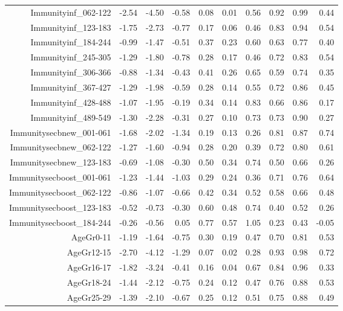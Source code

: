 \begin{table}[ht]
\begin{tabular}{rrrrrrrrrr}
  Immunityinf\_062-122 & -2.54 & -4.50 & -0.58 & 0.08 & 0.01 & 0.56 & 0.92 & 0.99 & 0.44 \\ 
  Immunityinf\_123-183 & -1.75 & -2.73 & -0.77 & 0.17 & 0.06 & 0.46 & 0.83 & 0.94 & 0.54 \\ 
  Immunityinf\_184-244 & -0.99 & -1.47 & -0.51 & 0.37 & 0.23 & 0.60 & 0.63 & 0.77 & 0.40 \\ 
  Immunityinf\_245-305 & -1.29 & -1.80 & -0.78 & 0.28 & 0.17 & 0.46 & 0.72 & 0.83 & 0.54 \\ 
  Immunityinf\_306-366 & -0.88 & -1.34 & -0.43 & 0.41 & 0.26 & 0.65 & 0.59 & 0.74 & 0.35 \\ 
  Immunityinf\_367-427 & -1.29 & -1.98 & -0.59 & 0.28 & 0.14 & 0.55 & 0.72 & 0.86 & 0.45 \\ 
  Immunityinf\_428-488 & -1.07 & -1.95 & -0.19 & 0.34 & 0.14 & 0.83 & 0.66 & 0.86 & 0.17 \\ 
  Immunityinf\_489-549 & -1.30 & -2.28 & -0.31 & 0.27 & 0.10 & 0.73 & 0.73 & 0.90 & 0.27 \\ 
  Immunitysecbnew\_001-061 & -1.68 & -2.02 & -1.34 & 0.19 & 0.13 & 0.26 & 0.81 & 0.87 & 0.74 \\ 
  Immunitysecbnew\_062-122 & -1.27 & -1.60 & -0.94 & 0.28 & 0.20 & 0.39 & 0.72 & 0.80 & 0.61 \\ 
  Immunitysecbnew\_123-183 & -0.69 & -1.08 & -0.30 & 0.50 & 0.34 & 0.74 & 0.50 & 0.66 & 0.26 \\ 
  Immunitysecboost\_001-061 & -1.23 & -1.44 & -1.03 & 0.29 & 0.24 & 0.36 & 0.71 & 0.76 & 0.64 \\ 
  Immunitysecboost\_062-122 & -0.86 & -1.07 & -0.66 & 0.42 & 0.34 & 0.52 & 0.58 & 0.66 & 0.48 \\ 
  Immunitysecboost\_123-183 & -0.52 & -0.73 & -0.30 & 0.60 & 0.48 & 0.74 & 0.40 & 0.52 & 0.26 \\ 
  Immunitysecboost\_184-244 & -0.26 & -0.56 & 0.05 & 0.77 & 0.57 & 1.05 & 0.23 & 0.43 & -0.05 \\ 
  AgeGr0-11 & -1.19 & -1.64 & -0.75 & 0.30 & 0.19 & 0.47 & 0.70 & 0.81 & 0.53 \\ 
  AgeGr12-15 & -2.70 & -4.12 & -1.29 & 0.07 & 0.02 & 0.28 & 0.93 & 0.98 & 0.72 \\ 
  AgeGr16-17 & -1.82 & -3.24 & -0.41 & 0.16 & 0.04 & 0.67 & 0.84 & 0.96 & 0.33 \\ 
  AgeGr18-24 & -1.44 & -2.12 & -0.75 & 0.24 & 0.12 & 0.47 & 0.76 & 0.88 & 0.53 \\ 
  AgeGr25-29 & -1.39 & -2.10 & -0.67 & 0.25 & 0.12 & 0.51 & 0.75 & 0.88 & 0.49 \\ 

\end{tabular}
\end{table}
